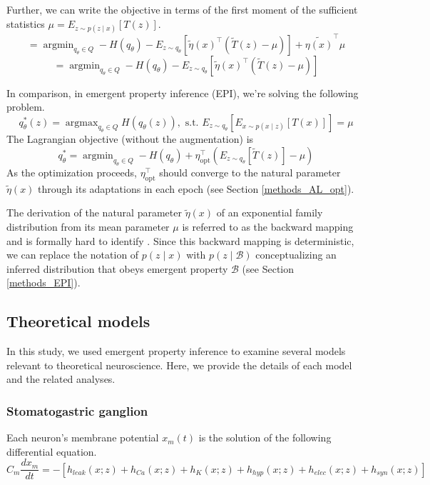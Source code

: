 \documentclass[11pt]{article}
\DeclareMathOperator*{\argmin}{argmin}
\DeclareMathOperator*{\argmax}{argmax}
\begin{document}
 Further, we can write the objective in terms of the first moment of the sufficient statistics $\mu = E_{z \sim p(z \mid x)}\left[T(z) \right]$.
 \begin{equation}
=  \argmin_{q_\theta \in Q} -H(q_\theta) - E_{z \sim q_\theta} \left[ \tilde{\eta}(x)^\top \left(  \tilde{T}(z) -\mu \right) \right] + \tilde{\eta(x)}^\top \mu
 \end{equation}
  \begin{equation}
=  \argmin_{q_\theta \in Q} -H(q_\theta) - E_{z \sim q_\theta} \left[ \tilde{\eta}(x)^\top \left(  \tilde{T}(z) -\mu \right) \right]
 \end{equation}

In comparison, in emergent property inference (EPI), we're solving the following problem.
\begin{equation}
q_\theta^*(z) = \argmax_{q_\theta \in Q} H(q_\theta(z)),   \text{  s.t.  } E_{z \sim q_\theta}\left[ E_{x\sim p(x \mid z)}\left[T(x)\right] \right] = \mu
\end{equation}
The Lagrangian objective (without the augmentation) is
\begin{equation}
q_\theta^* = \argmin_{q_\theta \in Q} - H(q_\theta) + \eta_{\text{opt}}^\top \left(E_{z \sim q_\theta} \left[\tilde{T}(z) \right] - \mu \right)
\end{equation}
As the optimization proceeds, $\eta_{\text{opt}}^\top$ should converge to the natural parameter $\tilde{\eta}(x)$ through its adaptations in each epoch (see Section \ref{methods_AL_opt}). 

The derivation of the natural parameter $\tilde{\eta}(x)$ of an exponential family distribution from its mean parameter $\mu$ is referred to as the backward mapping and is formally hard to identify \cite{wainwright2008graphical}.  Since this backward mapping is deterministic,  we can replace the notation of $p(z \mid x)$ with $p(z \mid \mathcal{B})$ conceptualizing an inferred distribution that obeys emergent property $\mathcal{B}$ (see Section \ref{methods_EPI}). 

\subsection{Theoretical models}\label{methods_theoretical_models}
In this study, we used emergent property inference to examine several models relevant to theoretical neuroscience.  Here, we provide the details of each model  and the related analyses.

\subsubsection{Stomatogastric ganglion}\label{methods_STG}
Each neuron's membrane potential $x_m(t)$ is the solution of the following differential equation.
\begin{equation} C_m \frac{dx_m}{dt} = - \left[ h_{leak}(x; z) + h_{Ca}(x; z) + h_K(x; z) + h_{hyp}(x; z) + h_{elec}(x; z) + h_{syn}(x; z)\right] 
\end{equation} 
\end{document}
